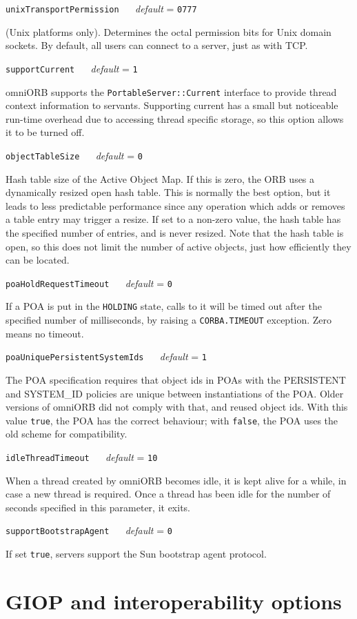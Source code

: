 \documentclass[11pt,oneside,a4paper]{book}
\makeatletter
\newcommand{\type}[1]{\texttt{#1}}
\newcommand{\code}[1]{\texttt{#1}}
\newcommand{\confopt}[2]
  {\vspace{\baselineskip}\par\noindent\code{#1} ~~ \textit{default} =
   \code{#2}}
\renewcommand{\confopt}[2]
  {\vspace{\baselineskip}\par\noindent\code{#1} ~~ \textit{default} =
   \code{#2}\\[-1ex]\@afterheading}
\makeatother
\begin{document}
\confopt{unixTransportPermission}{0777}

(Unix platforms only). Determines the octal permission bits for Unix
domain sockets. By default, all users can connect to a server, just as
with TCP.


\confopt{supportCurrent}{1}

omniORB supports the \type{PortableServer::Current} interface to
provide thread context information to servants. Supporting current has
a small but noticeable run-time overhead due to accessing thread
specific storage, so this option allows it to be turned off.


\confopt{objectTableSize}{0}

Hash table size of the Active Object Map. If this is zero, the ORB
uses a dynamically resized open hash table. This is normally the best
option, but it leads to less predictable performance since any
operation which adds or removes a table entry may trigger a resize. If
set to a non-zero value, the hash table has the specified number of
entries, and is never resized. Note that the hash table is open, so
this does not limit the number of active objects, just how efficiently
they can be located.


\confopt{poaHoldRequestTimeout}{0}

If a POA is put in the \code{HOLDING} state, calls to it will be timed
out after the specified number of milliseconds, by raising a
\code{CORBA.TIMEOUT} exception. Zero means no timeout.

\confopt{poaUniquePersistentSystemIds}{1}

The POA specification requires that object ids in POAs with the
PERSISTENT and SYSTEM\_ID policies are unique between instantiations
of the POA. Older versions of omniORB did not comply with that, and
reused object ids. With this value \code{true}, the POA has the
correct behaviour; with \code{false}, the POA uses the old scheme for
compatibility.

\confopt{idleThreadTimeout}{10}

When a thread created by omniORB becomes idle, it is kept alive for a
while, in case a new thread is required. Once a thread has been idle
for the number of seconds specified in this parameter, it exits.

\confopt{supportBootstrapAgent}{0}

If set \code{true}, servers support the Sun bootstrap agent protocol.



\section{GIOP and interoperability options}
\end{document}
